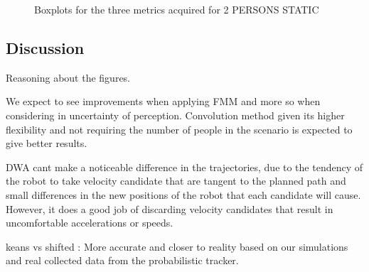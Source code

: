 \begin{figure}[t!]
%
\hspace{0.1cm}
%

\caption{Boxplots for the three metrics acquired for 2 PERSONS STATIC}
\label{fig:boxplots_2people}
\end{figure}


\subsection{Discussion}
\label{sec:discussion}

Reasoning about the figures.

We expect to see improvements when applying FMM and more so when considering in uncertainty of perception. Convolution method given its higher flexibility and not requiring the number of people in the scenario is expected to give better results.

DWA cant make a noticeable difference in the trajectories, due to the tendency of the robot to take velocity candidate that are tangent to the planned path and small differences in the new positions of the robot that each candidate will cause. However, it does a good job of discarding velocity candidates that result in uncomfortable accelerations or speeds.


keans vs shifted : 
 More accurate and closer to reality based on our simulations and real collected data from the probabilistic tracker.